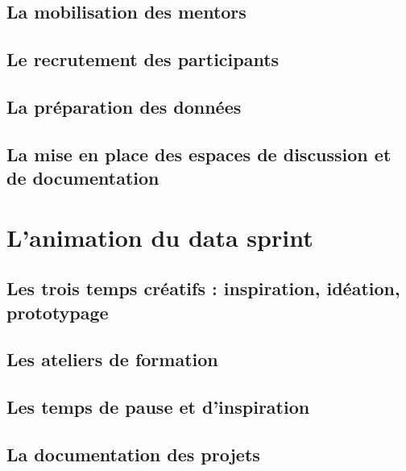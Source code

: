 \documentclass[]{book}
\begin{document}
\section{La mobilisation des mentors}\label{la-mobilisation-des-mentors}

\section{Le recrutement des
participants}\label{le-recrutement-des-participants}

\section{La préparation des données}\label{la-preparation-des-donnees}

\section{La mise en place des espaces de discussion et de
documentation}\label{la-mise-en-place-des-espaces-de-discussion-et-de-documentation}

\chapter{L'animation du data sprint}\label{animation}

\section{Les trois temps créatifs : inspiration, idéation,
prototypage}\label{les-trois-temps-creatifs-inspiration-ideation-prototypage}

\section{Les ateliers de formation}\label{les-ateliers-de-formation}

\section{Les temps de pause et
d'inspiration}\label{les-temps-de-pause-et-dinspiration}

\section{La documentation des
projets}\label{la-documentation-des-projets}
\end{document}
